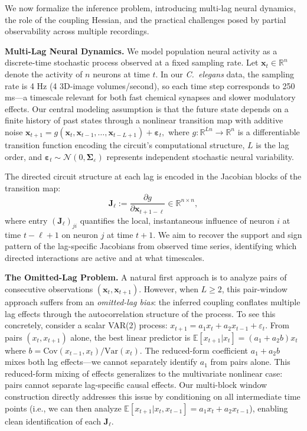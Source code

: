 \documentclass{article}
\theoremstyle{plain}
\theoremstyle{definition}
\theoremstyle{remark}
\newcommand{\R}{\mathbb{R}}
\newcommand{\E}{\mathbb{E}}
\newcommand{\Var}{\mathrm{Var}}
\newcommand{\Cov}{\mathrm{Cov}}
\newcommand{\1}{\mathbf{1}}
\newcommand{\x}{\bm{x}}
\newcommand{\eps}{\bm{\varepsilon}}
\newcommand{\J}{\bm{J}}
\newcommand{\Sig}{\bm{\Sigma}}
\newcommand{\Sigeps}{\Sig_\varepsilon}
\begin{document}
We now formalize the inference problem, introducing multi-lag neural dynamics, the role of the coupling Hessian, and the practical challenges posed by partial observability across multiple recordings.

\textbf{Multi-Lag Neural Dynamics.} We model population neural activity as a discrete-time stochastic process observed at a fixed sampling rate. Let $\x_t \in \R^n$ denote the activity of $n$ neurons at time $t$. In our \emph{C.~elegans} data, the sampling rate is 4 Hz (4 3D-image volumes/second), so each time step corresponds to 250 ms---a timescale relevant for both fast chemical synapses and slower modulatory effects. Our central modeling assumption is that the future state depends on a finite history of past states through a nonlinear transition map with additive noise $\x_{t+1} = g(\x_t, \x_{t-1}, \ldots, \x_{t-L+1}) + \eps_t,$
where $g: \R^{Ln} \to \R^n$ is a differentiable transition function encoding the circuit's computational structure, $L$ is the lag order, and $\eps_t \sim \mathcal{N}(0, \Sigeps)$ represents independent stochastic neural variability.

The directed circuit structure at each lag is encoded in the Jacobian blocks of the transition map:
\begin{equation}
\J_\ell := \frac{\partial g}{\partial \x_{t+1-\ell}} \in \R^{n \times n},
\end{equation}
where entry $(\J_\ell)_{ji}$ quantifies the local, instantaneous influence of neuron $i$ at time $t{-}\ell{+}1$ on neuron $j$ at time $t{+}1$. We aim to recover the support and sign pattern of the lag-specific Jacobians from observed time series, identifying which directed interactions are active and at what timescales.

\textbf{The Omitted-Lag Problem.} A natural first approach is to analyze pairs of consecutive observations $(\x_t, \x_{t+1})$. However, when $L \ge 2$, this pair-window approach suffers from an \emph{omitted-lag bias}: the inferred coupling conflates multiple lag effects through the autocorrelation structure of the process. To see this concretely, consider a scalar VAR(2) process:
$
x_{t+1} = a_1 x_t + a_2 x_{t-1} + \varepsilon_t.
$
From pairs $(x_t, x_{t+1})$ alone, the best linear predictor is $\E[x_{t+1}|x_t] = (a_1 + a_2 b)x_t$ where $b = \Cov(x_{t-1}, x_t)/\Var(x_t)$. The reduced-form coefficient $a_1 + a_2 b$ mixes both lag effects---we cannot separately identify $a_1$ from pairs alone. This reduced-form mixing of effects generalizes to the multivariate nonlinear case: pairs cannot separate lag-specific causal effects. Our multi-block window construction directly addresses this issue by conditioning on all intermediate time points (i.e., we can then analyze $\E[x_{t+1}|x_t, x_{t-1}] = a_1x_t + a_2 x_{t-1}$), enabling clean identification of each $\J_\ell$.
\end{document}
